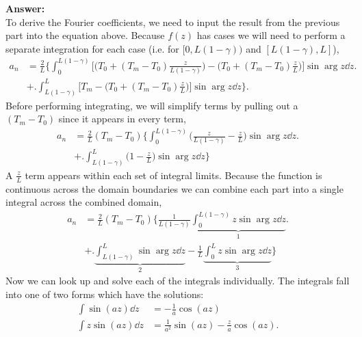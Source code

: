 \begin{enumerate}
    {\bf Answer:}\\
    To derive the Fourier coefficients, we need to input the result from the
    previous part into the equation above.  Because $f(z)$ has cases we will
    need to perform a separate integration for each case (i.e. for $[0,L(1 -
    \gamma))$ and $[L(1 - \gamma),L]$),
    \begin{align*}
        a_{n} &= \frac{2}{L} \Biggl\{ 
            \int_0^{L(1 - \gamma)}
            \Biggl[\biggl(T_0 + (T_m - T_0) \frac{z}{L(1 - \gamma)}\biggr)
            - \biggl(T_0 + (T_m - T_0) \frac{z}{L}\biggr) \Biggr]
            \sin \arg{z} \dd{z} \Biggr. \\
            &+ \Biggl. \int_{L(1 - \gamma)}^L
            \Biggl[T_m - \biggl(T_0 + (T_m - T_0) \frac{z}{L}\biggr) \Biggr]
            \sin \arg{z} \dd{z}
        \Biggr\} .
    \end{align*}
    Before performing integrating, we will simplify terms by pulling out a
    $(T_m - T_0)$ since it appears in every term,
    \begin{align*}
        a_{n} &= \frac{2}{L} (T_m - T_0) \Biggl\{ 
            \int_0^{L(1 - \gamma)}
            \biggl(\frac{z}{L(1 - \gamma)} - \frac{z}{L}\biggr)
            \sin \arg{z} \dd{z} \Biggr. \\
            & + \Biggl. \int_{L(1 - \gamma)}^L
            \biggl( 1 - \frac{z}{L} \biggr) \sin \arg{z} \dd{z} \Biggr\}
    \end{align*}
    A $\frac{z}{L}$ term appears within each set of integral limits.
    Because the function is continuous across the domain boundaries we can
    combine each part into a single integral across the combined domain,
    \begin{align*}
        a_{n} &= \frac{2}{L} (T_m - T_0) \Biggl\{ 
            \frac{1}{L(1 - \gamma)} \underbrace{\int_0^{L(1 - \gamma)}
            z \sin \arg{z} \dd{z}}_1 \Biggr.\\
            & + \Biggl. \underbrace{\int_{L(1 - \gamma)}^L \sin \arg{z} \dd{z}}_2
            - \frac{1}{L} \underbrace{\int_0^L z \sin \arg{z} \dd{z}}_3 \Biggr\}
    \end{align*}
    Now we can look up and solve each of the integrals individually.  The
    integrals fall into one of two forms which have the solutions:
    \begin{align*}
        \int \sin (az) \dd{z} &= -\frac{1}{a} \cos (az) \\
        \int z \sin (az) \dd{z} &= \frac{1}{a^2} \sin (az) - \frac{z}{a} \cos
        (az) .

\end{align*}
\end{enumerate}
